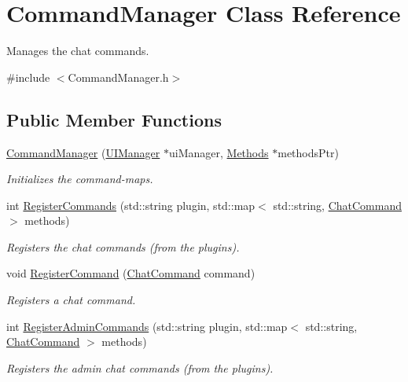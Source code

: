 \hypertarget{classCommandManager}{\section{Command\-Manager Class Reference}
\label{classCommandManager}
}


Manages the chat commands.  




{\ttfamily \#include $<$Command\-Manager.\-h$>$}

\subsection*{Public Member Functions}
\begin{DoxyCompactItemize}
\item 
\hyperlink{classCommandManager_ae336627646d192bf5acccea5c5a4f5fc}{Command\-Manager} (\hyperlink{classUIManager}{U\-I\-Manager} $\ast$ui\-Manager, \hyperlink{classMethods}{Methods} $\ast$methods\-Ptr)
\begin{DoxyCompactList}\small\item\em Initializes the command-\/maps. \end{DoxyCompactList}\item 
int \hyperlink{classCommandManager_ae5fd4d49aa57f6e764721dea41757668}{Register\-Commands} (std\-::string plugin, std\-::map$<$ std\-::string, \hyperlink{structChatCommand}{Chat\-Command} $>$ methods)
\begin{DoxyCompactList}\small\item\em Registers the chat commands (from the plugins). \end{DoxyCompactList}\item 
void \hyperlink{classCommandManager_a6de4460ec73602e0a650bf8650365c82}{Register\-Command} (\hyperlink{structChatCommand}{Chat\-Command} command)
\begin{DoxyCompactList}\small\item\em Registers a chat command. \end{DoxyCompactList}\item 
int \hyperlink{classCommandManager_a2c4267f0865407f6743408b0243d5bb3}{Register\-Admin\-Commands} (std\-::string plugin, std\-::map$<$ std\-::string, \hyperlink{structChatCommand}{Chat\-Command} $>$ methods)
\begin{DoxyCompactList}\small\item\em Registers the admin chat commands (from the plugins). \end{DoxyCompactList}\item 

\end{DoxyCompactItemize}
